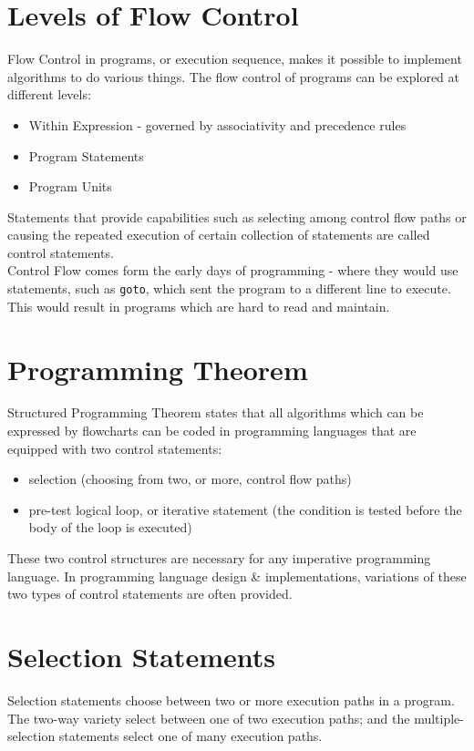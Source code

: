
\section{Levels of Flow Control}
Flow Control in programs, or execution sequence, makes it possible to implement algorithms to do various things. The flow control of programs can be explored at different levels:
\begin{itemize}
    \item Within Expression - governed by associativity and precedence rules
    \item Program Statements
    \item Program Units
\end{itemize}

Statements that provide capabilities such as selecting among control flow paths or causing the repeated execution of certain collection of statements are called control statements.\\

Control Flow comes form the early days of programming - where they would use statements, such as \verb|goto|, which sent the program to a different line to execute. This would result in programs which are hard to read and maintain. 

\section{Programming Theorem}
Structured Programming Theorem states that all algorithms which can be expressed by flowcharts can be coded in programming languages that are equipped with two control statements:
\begin{itemize}
    \item selection (choosing from two, or more, control flow paths)
    \item pre-test logical loop, or iterative statement (the condition is tested before the body of the loop is executed)
\end{itemize}

These two control structures are necessary for any imperative programming language. In programming language design \& implementations, variations of these two types of control statements are often provided. 

\section{Selection Statements}
Selection statements choose between two or more execution paths in a program. The two-way variety select between one of two execution paths; and the multiple-selection statements select one of many execution paths.

